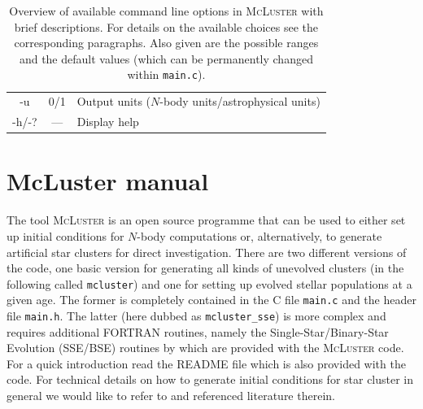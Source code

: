 \documentclass[useAMS,usenatbib]{mn2e}
\begin{document}
\begin{table}
\begin{minipage}{\textwidth}
{\begin{tabular}{ccl}
      -u  & 0/1 & Output units ($N$-body units/astrophysical units)\\           
      -h/-? & --- & Display help                                        
\end{tabular}
}
\caption{Overview of available command line options in \textsc{McLuster} with brief descriptions. For details on the available choices see the corresponding paragraphs. Also given are the possible ranges and the default values (which can be permanently changed within \texttt{main.c}).}
\end{minipage}
\label{overviewtable}
\end{table}

\section*{McLuster manual}
\noindent The tool \textsc{McLuster} is an open source programme that can be used to either set up initial conditions for $N$-body computations or, alternatively, to generate artificial star clusters for direct investigation. There are two different versions of the code, one basic version for generating all kinds of unevolved clusters (in the following called \texttt{mcluster}) and one for setting up evolved stellar populations at a given age. The former is completely contained in the \textsc{C} file \texttt{main.c} and the header file \texttt{main.h}. The latter (here dubbed as \texttt{mcluster\_sse}) is more complex and requires additional \textsc{FORTRAN} routines, namely the Single-Star/Binary-Star Evolution (\textsc{SSE/BSE}) routines by \citet{Hurley00, Hurley02} which are provided with the \textsc{McLuster} code. For a quick introduction read the README file which is also provided with the code. For technical details on how to generate initial conditions for star cluster in general we would like to refer to \citet{Kroupa08} and referenced literature therein. 
\end{document}
